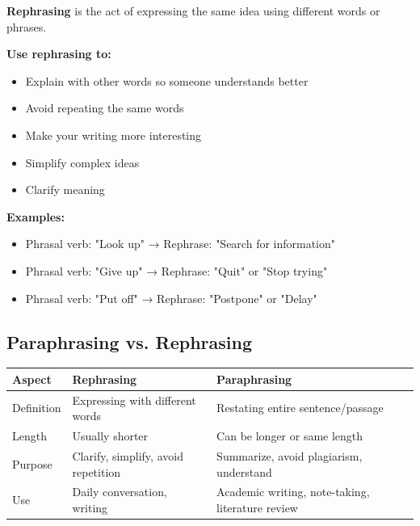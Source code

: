 \begin{grammarbox}[title=When to Use Rephrasing]
\textbf{Rephrasing} is the act of expressing the same idea using different words or phrases.

\textbf{Use rephrasing to:}
\begin{itemize}
    \item Explain with other words so someone understands better
    \item Avoid repeating the same words
    \item Make your writing more interesting
    \item Simplify complex ideas
    \item Clarify meaning
\end{itemize}

\textbf{Examples:}
\begin{itemize}
    \item Phrasal verb: "Look up" → Rephrase: "Search for information"
    \item Phrasal verb: "Give up" → Rephrase: "Quit" or "Stop trying"
    \item Phrasal verb: "Put off" → Rephrase: "Postpone" or "Delay"
\end{itemize}
\end{grammarbox}

\subsection{Paraphrasing vs. Rephrasing}

\begin{table}[h]
\centering
\begin{tabular}{|l|p{5cm}|p{5cm}|}
\hline
\textbf{Aspect} & \textbf{Rephrasing} & \textbf{Paraphrasing} \\
\hline
Definition & Expressing with different words & Restating entire sentence/passage \\
\hline
Length & Usually shorter & Can be longer or same length \\
\hline
Purpose & Clarify, simplify, avoid repetition & Summarize, avoid plagiarism, understand \\
\hline
Use & Daily conversation, writing & Academic writing, note-taking, literature review \\
\hline
\end{tabular}
\end{table}

